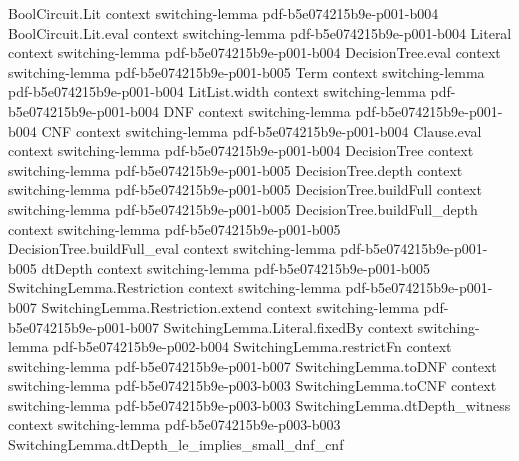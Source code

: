 \begin{theorem}
\label{LMN.restricted_has_small_dnf_of_dtDepth_le}
\leanok
{}
\proofstep
  {BoolCircuit.Lit}
  {context}
  {switching-lemma}
  {pdf-b5e074215b9e-p001-b004}
\proofstep
  {BoolCircuit.Lit.eval}
  {context}
  {switching-lemma}
  {pdf-b5e074215b9e-p001-b004}
\proofstep
  {Literal}
  {context}
  {switching-lemma}
  {pdf-b5e074215b9e-p001-b004}
\proofstep
  {DecisionTree.eval}
  {context}
  {switching-lemma}
  {pdf-b5e074215b9e-p001-b005}
\proofstep
  {Term}
  {context}
  {switching-lemma}
  {pdf-b5e074215b9e-p001-b004}
\proofstep
  {LitList.width}
  {context}
  {switching-lemma}
  {pdf-b5e074215b9e-p001-b004}
\proofstep
  {DNF}
  {context}
  {switching-lemma}
  {pdf-b5e074215b9e-p001-b004}
\proofstep
  {CNF}
  {context}
  {switching-lemma}
  {pdf-b5e074215b9e-p001-b004}
\proofstep
  {Clause.eval}
  {context}
  {switching-lemma}
  {pdf-b5e074215b9e-p001-b004}
\proofstep
  {DecisionTree}
  {context}
  {switching-lemma}
  {pdf-b5e074215b9e-p001-b005}
\proofstep
  {DecisionTree.depth}
  {context}
  {switching-lemma}
  {pdf-b5e074215b9e-p001-b005}
\proofstep
  {DecisionTree.buildFull}
  {context}
  {switching-lemma}
  {pdf-b5e074215b9e-p001-b005}
\proofstep
  {DecisionTree.buildFull_depth}
  {context}
  {switching-lemma}
  {pdf-b5e074215b9e-p001-b005}
\proofstep
  {DecisionTree.buildFull_eval}
  {context}
  {switching-lemma}
  {pdf-b5e074215b9e-p001-b005}
\proofstep
  {dtDepth}
  {context}
  {switching-lemma}
  {pdf-b5e074215b9e-p001-b005}
\proofstep
  {SwitchingLemma.Restriction}
  {context}
  {switching-lemma}
  {pdf-b5e074215b9e-p001-b007}
\proofstep
  {SwitchingLemma.Restriction.extend}
  {context}
  {switching-lemma}
  {pdf-b5e074215b9e-p001-b007}
\proofstep
  {SwitchingLemma.Literal.fixedBy}
  {context}
  {switching-lemma}
  {pdf-b5e074215b9e-p002-b004}
\proofstep
  {SwitchingLemma.restrictFn}
  {context}
  {switching-lemma}
  {pdf-b5e074215b9e-p001-b007}
\proofstep
  {SwitchingLemma.toDNF}
  {context}
  {switching-lemma}
  {pdf-b5e074215b9e-p003-b003}
\proofstep
  {SwitchingLemma.toCNF}
  {context}
  {switching-lemma}
  {pdf-b5e074215b9e-p003-b003}
\proofstep
  {SwitchingLemma.dtDepth_witness}
  {context}
  {switching-lemma}
  {pdf-b5e074215b9e-p003-b003}
\proofstep
  {SwitchingLemma.dtDepth_le_implies_small_dnf_cnf}

\end{theorem}
